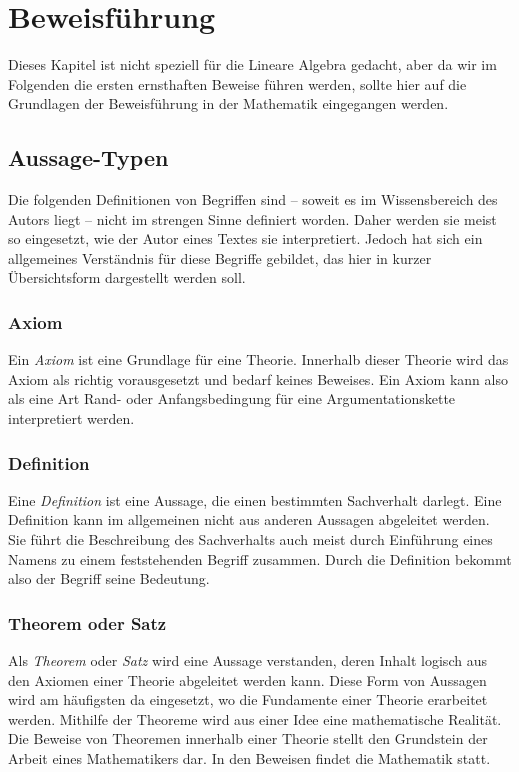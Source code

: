
\chapter{Beweisführung}

Dieses Kapitel ist nicht speziell für die Lineare Algebra gedacht, aber da wir im Folgenden die ersten ernsthaften Beweise führen werden, sollte hier auf die Grundlagen der Beweisführung in der Mathematik eingegangen werden.

\section{Aussage-Typen}

Die folgenden Definitionen von Begriffen sind -- soweit es im Wissensbereich des Autors liegt -- nicht im strengen Sinne definiert worden. Daher werden sie meist so eingesetzt, wie der Autor eines Textes sie interpretiert. Jedoch hat sich ein allgemeines Verständnis für diese Begriffe gebildet, das hier in kurzer Übersichtsform dargestellt werden soll.

\subsection{Axiom}

Ein \emph{Axiom} ist eine Grundlage für eine Theorie. Innerhalb dieser Theorie wird das Axiom als richtig vorausgesetzt und bedarf keines Beweises. Ein Axiom kann also als eine Art Rand- oder Anfangsbedingung für eine Argumentationskette interpretiert werden.

\subsection{Definition}

Eine \emph{Definition} ist eine Aussage, die einen bestimmten Sachverhalt darlegt. Eine Definition kann im allgemeinen nicht aus anderen Aussagen abgeleitet werden. Sie führt die Beschreibung des Sachverhalts auch meist durch Einführung eines Namens zu einem feststehenden Begriff zusammen. Durch die Definition bekommt also der Begriff seine Bedeutung.

\subsection{Theorem oder Satz}

Als \emph{Theorem} oder \emph{Satz} wird eine Aussage verstanden, deren Inhalt logisch aus den Axiomen einer Theorie abgeleitet werden kann. Diese Form von Aussagen wird am häufigsten da eingesetzt, wo die Fundamente einer Theorie erarbeitet werden. Mithilfe der Theoreme wird aus einer Idee eine mathematische Realität. Die Beweise von Theoremen innerhalb einer Theorie stellt den Grundstein der Arbeit eines Mathematikers dar. In den Beweisen findet die Mathematik statt.

